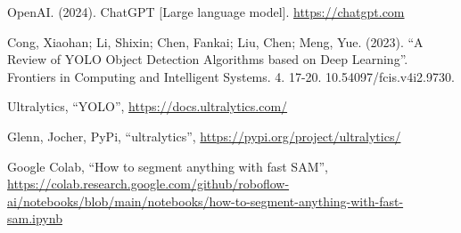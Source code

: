 \documentclass[conference]{IEEEtran}
\begin{document}
\begin{thebibliography}{00}
   OpenAI. (2024). ChatGPT [Large language model]. \url{https://chatgpt.com}

   Cong, Xiaohan; Li, Shixin; Chen, Fankai; Liu, Chen; Meng, Yue. (2023). ``A Review of YOLO Object Detection Algorithms based on Deep Learning''. Frontiers in Computing and Intelligent Systems. 4. 17-20. 10.54097/fcis.v4i2.9730.

   Ultralytics, ``YOLO'', \url{https://docs.ultralytics.com/}

   Glenn, Jocher, PyPi, ``ultralytics'', \url{https://pypi.org/project/ultralytics/}

   Google Colab, ``How to segment anything with fast SAM'', \url{https://colab.research.google.com/github/roboflow-ai/notebooks/blob/main/notebooks/how-to-segment-anything-with-fast-sam.ipynb}
\end{thebibliography}
\vspace{80px}
\end{document}
